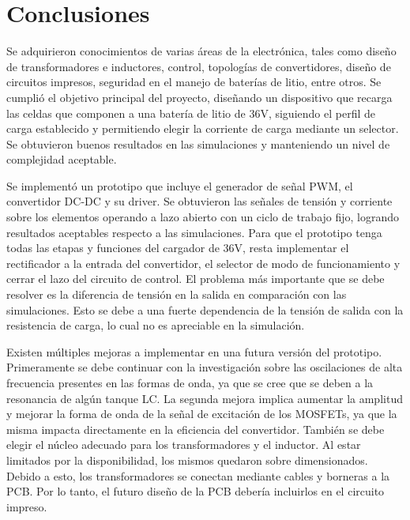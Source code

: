 \section{Conclusiones}

  

Se adquirieron conocimientos de varias áreas de la electrónica, tales como diseño de transformadores e inductores, control, topologías de convertidores, diseño de circuitos impresos, seguridad en el manejo de baterías de litio, entre otros.
Se cumplió el objetivo principal del proyecto, diseñando un dispositivo que recarga las celdas que componen a una batería de litio de 36V, siguiendo el perfil de carga establecido y permitiendo elegir la corriente de carga mediante un selector.
Se obtuvieron buenos resultados en las simulaciones y manteniendo un nivel de complejidad aceptable.

Se implementó un prototipo que incluye el generador de señal PWM, el convertidor DC-DC y su driver.
Se obtuvieron las señales de tensión y corriente sobre los elementos operando a lazo abierto con un ciclo de trabajo fijo, logrando resultados aceptables respecto a las simulaciones.
Para que el prototipo tenga todas las etapas y funciones del cargador de 36V, resta implementar el rectificador a la entrada del convertidor, el selector de modo de funcionamiento y cerrar el lazo del circuito de control.
El problema más importante que se debe resolver es la diferencia de tensión en la salida en comparación con las simulaciones.
Esto se debe a una fuerte dependencia de la tensión de salida con la resistencia de carga,
lo cual no es apreciable en la simulación.

Existen múltiples mejoras a implementar en una futura versión del prototipo.
Primeramente se debe continuar con la investigación sobre las oscilaciones de alta frecuencia presentes en las formas de onda, ya que se cree que se deben a la resonancia de algún tanque LC.
La segunda mejora implica aumentar la amplitud y mejorar la forma de onda de la señal de excitación de los MOSFETs, ya que la misma impacta directamente en la eficiencia del convertidor.
También se debe elegir el núcleo adecuado para los transformadores y el inductor. Al estar limitados por la disponibilidad, los mismos quedaron sobre dimensionados. 
Debido a esto, los transformadores se conectan mediante cables y borneras a la PCB. 
Por lo tanto, el futuro diseño de la PCB debería incluirlos en el circuito impreso.
